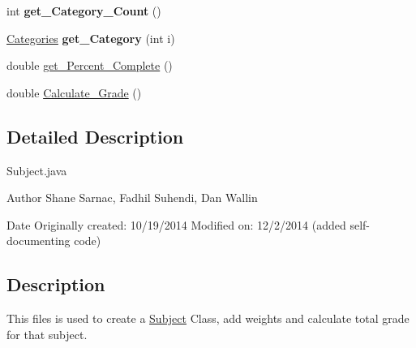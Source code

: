 \begin{DoxyCompactItemize}
\item 
\hypertarget{class_subject_afe4fbca6c4ba60f116b8624ebb938451}{int {\bfseries get\-\_\-\-Category\-\_\-\-Count} ()}\label{class_subject_afe4fbca6c4ba60f116b8624ebb938451}

\item 
\hypertarget{class_subject_a76bcd6c2b287551978bcc123fdbd5d96}{\hyperlink{class_categories}{Categories} {\bfseries get\-\_\-\-Category} (int i)}\label{class_subject_a76bcd6c2b287551978bcc123fdbd5d96}

\item 
double \hyperlink{class_subject_ac0fee3b13cce262f5a63d4c984eb2ac6}{get\-\_\-\-Percent\-\_\-\-Complete} ()
\item 
double \hyperlink{class_subject_ae6d10e532321fc7fa0cb7be73053ae67}{Calculate\-\_\-\-Grade} ()
\end{DoxyCompactItemize}


\subsection{Detailed Description}
Subject.\-java

\begin{DoxyAuthor}{Author}
Shane Sarnac, Fadhil Suhendi, Dan Wallin 

 
\end{DoxyAuthor}
\begin{DoxyDate}{Date}
Originally created\-: 10/19/2014  Modified on\-: 12/2/2014 (added self-\/documenting code)
\end{DoxyDate}


\hypertarget{index_desc}{}\subsection{Description}\label{index_desc}
This files is used to create a \hyperlink{class_subject}{Subject} Class, add weights and calculate total grade for that subject. 

